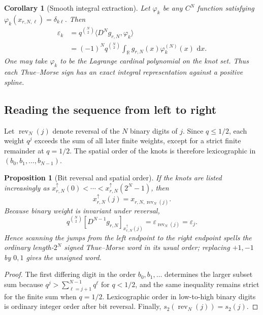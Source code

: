 \documentclass[11pt,oneside]{article}
\numberwithin{equation}{section}
\newtheorem{proposition}[theorem]{Proposition}
\newtheorem{corollary}[theorem]{Corollary}
\theoremstyle{definition}
\theoremstyle{remark}
\newcommand{\R}{\mathbb R}
\newcommand{\dd}{\,\mathrm d}
\newcommand{\eps}{\varepsilon}
\newcommand{\jump}[2]{\left[#1\right]_{#2}}
\begin{document}
\begin{corollary}[Smooth integral extraction]
\label{cor:smooth-TM-extraction}
Let $\varphi_k$ be any $C^N$ function satisfying
$\varphi_k(x_{r,N,\ell})=\delta_{k\ell}$.  Then
\begin{align}
 \eps_k
 &=q^{\binom N2}\langle D^Ng_{r,N},\varphi_k\rangle       \label{eq:eps-test-function}\\
 &=(-1)^Nq^{\binom N2}
   \int_{\R}g_{r,N}(x)\varphi_k^{(N)}(x)\,\dd x.          \label{eq:eps-integral-extraction}
\end{align}
One may take $\varphi_k$ to be the Lagrange cardinal polynomial on the knot
set.  Thus each Thue--Morse sign has an exact integral representation against a
positive spline.
\end{corollary}

\subsection{Reading the sequence from left to right}

Let $\operatorname{rev}_N(j)$ denote reversal of the $N$ binary digits of
$j$.  Since $q\le1/2$, each weight $q^j$ exceeds the sum of all later finite
weights, except for a strict finite remainder at $q=1/2$.  The spatial order of
the knots is therefore lexicographic in $(b_0,b_1,\ldots,b_{N-1})$.

\begin{proposition}[Bit reversal and spatial order]
\label{prop:bit-reversal-order}
If the knots are listed increasingly as
$x_{r,N}^{\uparrow}(0)<\cdots<x_{r,N}^{\uparrow}(2^N-1)$, then
\begin{equation}
 x_{r,N}^{\uparrow}(j)=x_{r,N,\operatorname{rev}_N(j)}.    \label{eq:knot-bit-reversal}
\end{equation}
Because binary weight is invariant under reversal,
\begin{equation}
 q^{\binom N2}
 \jump{D^{N-1}g_{r,N}}{x_{r,N}^{\uparrow}(j)}
 =\eps_{\operatorname{rev}_N(j)}=\eps_j.                  \label{eq:spatial-TM}
\end{equation}
Hence scanning the jumps from the left endpoint to the right endpoint spells
the ordinary length-$2^N$ signed Thue--Morse word in its usual order; replacing
$+1,-1$ by $0,1$ gives the unsigned word.
\end{proposition}

\begin{proof}
The first differing digit in the order $b_0,b_1,\ldots$ determines the larger
subset sum because
$q^j>\sum_{\ell=j+1}^{N-1}q^\ell$ for $q<1/2$, and the same inequality remains
strict for the finite sum when $q=1/2$.  Lexicographic order in low-to-high
binary digits is ordinary integer order after bit reversal.  Finally,
$s_2(\operatorname{rev}_N(j))=s_2(j)$.
\end{proof}
\end{document}
